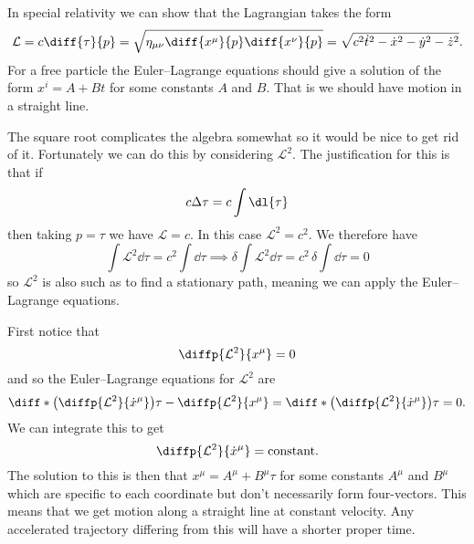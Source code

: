 \documentclass[fleqn]{NotesClass}
\newcommand*{\lagrangian}{\mathcal{L}}
\begin{document}
    In special relativity we can show that the Lagrangian takes the form
    \begin{equation}
        \lagrangian = c\diff{\tau}{p} = \sqrt{\eta_{\mu\nu} \diff{x^\mu}{p} \diff{x^\nu}{p}} = \sqrt{c^2\dot{t}^2 - \dot{x}^2 - \dot{y}^2 - \dot{z}^2}.
    \end{equation}
    For a free particle the Euler--Lagrange equations should give a solution of the form \(x^i = A + Bt\) for some constants \(A\) and \(B\).
    That is we should have motion in a straight line.
    
    The square root complicates the algebra somewhat so it would be nice to get rid of it.
    Fortunately we can do this by considering \(\lagrangian^2\).
    The justification for this is that if
    \begin{equation}
        c\Delta \tau = c\int \dl{\tau}
    \end{equation}
    then taking \(p = \tau\) we have \(\lagrangian = c\).
    In this case \(\lagrangian^2 = c^2\).
    We therefore have
    \begin{equation}
        \int \lagrangian^2 \dd{\tau} = c^2\int \dd{\tau} \implies \delta \int \lagrangian^2 \dd{\tau} = c^2 \, \delta\int \dd{\tau} = 0
    \end{equation}
    so \(\lagrangian^2\) is also such as to find a stationary path, meaning we can apply the Euler--Lagrange equations.
    
    First notice that
    \begin{equation}
        \diffp{\lagrangian^2}{x^\mu} = 0
    \end{equation}
    and so the Euler--Lagrange equations for \(\lagrangian^2\) are
    \begin{equation}
        \diff*{\left( \diffp{\lagrangian^2}{\dot{x}^\mu} \right)}{\tau} - \diffp{\lagrangian^2}{x^\mu} = \diff*{\left( \diffp{\lagrangian^2}{\dot{x}^\mu} \right)}{\tau} = 0.
    \end{equation}
    We can integrate this to get
    \begin{equation}
        \diffp{\lagrangian^2}{\dot{x}^\mu} = \text{constant}.
    \end{equation}
    The solution to this is then that \(x^\mu = A^\mu + B^\mu\tau\) for some constants \(A^\mu\) and \(B^\mu\) which are specific to each coordinate but don't necessarily form four-vectors.
    This means that we get motion along a straight line at constant velocity.
    Any accelerated trajectory differing from this will have a shorter proper time.
    
\end{document}
